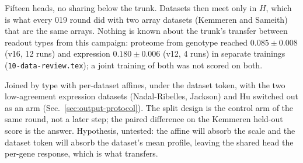 Fifteen heads, no sharing below the trunk. Datasets then meet only in $H$, which is what
every 019 round did with two array datasets (Kemmeren and Sameith) that are the same
arrays. Nothing is known about the trunk's transfer between readout types from this
campaign: proteome from genotype reached $0.085 \pm 0.008$ (v16, 12 runs) and expression
$0.180 \pm 0.006$ (v12, 4 runs) in separate trainings (\texttt{10-data-review.tex}); a joint
training of both was not scored on both.

Joined by type with per-dataset affines, under the dataset token, with the two
low-agreement expression datasets (Nadal-Ribelles, Jackson) and Hu switched out as an
arm (Sec.~\ref{sec:output-protocol}). The split design is the control arm of the same
round, not a later step; the paired difference on the Kemmeren held-out score is the
answer. Hypothesis, untested: the affine will absorb the scale and the dataset token will
absorb the dataset's mean profile, leaving the shared head the per-gene response, which is
what transfers.

